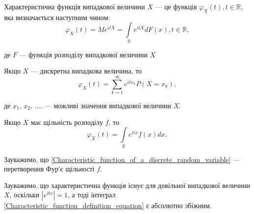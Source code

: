 \begin{definition}
    Характеристична функція випадкової величини $X$ --- це
    функція $\varphi_{X}(t), t \in \mathbb{R}$, яка визначається
    наступним чином:
    \begin{equation}
        \label{Characteristic_function_definition_equation}
        \varphi_{X}(t)
        = Me^{itX}
        = \int\limits_{\mathbb{R}} e^{itX} dF(x), t \in \mathbb{R},
    \end{equation}
    
    де $F$ --- функція розподілу випадкової величини $X$
    
    Якщо $X$ --- дискретна випадкова величина, то
    \begin{equation}
        \label{Characteristic_function_of_a_discrete_random_variable}
        \varphi_{X}(t)
        = \sum\limits_{k=1}^{\infty} e^{itx_k} P(X = x_k),
    \end{equation}
    
    де $x_1$, $x_2$, .... --- можливі значення випадкової величини $X$.

    Якщо $X$ має щільність розподілу $f$, то
    \begin{equation}
        \varphi_{X}(t)
        = \int\limits_{\mathbb{R}} e^{itx} f(x) dx,
    \end{equation}
\end{definition}

Зауважимо, що \ref{Characteristic_function_of_a_discrete_random_variable}
--- перетворення Фур'є щільності $f$.

Зауважимо, що характеристична функція існує для довільної
випадкової величини $X$, оскільки $|e^{itx}| = 1$, а тоді
інтеграл \ref{Characteristic_function_definition_equation}
є абсолютно збіжним.

